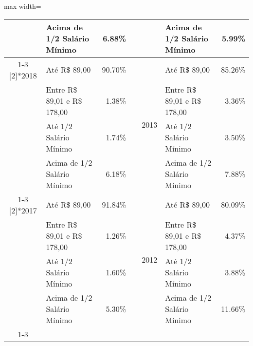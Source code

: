\documentclass[14pt]{extarticle}
\begin{document}
\begin{table}[htbp]
\begin{adjustbox}{max width=\linewidth}
\begin{tabular}{clrrclr}
         & Acima de 1/2 Salário Mínimo & 6.88\% &      &      & Acima de 1/2 Salário Mínimo & 5.99\% \\
\cmidrule{1-3}\cmidrule{5-7}    \multirow{4}[2]{*}{2018} & Até R\$ 89,00 & 90.70\% &      & \multirow{4}[2]{*}{2013} & Até R\$ 89,00 & 85.26\% \\
         & Entre R\$ 89,01 e R\$ 178,00 & 1.38\% &      &      & Entre R\$ 89,01 e R\$ 178,00 & 3.36\% \\
         & Até 1/2 Salário Mínimo & 1.74\% &      &      & Até 1/2 Salário Mínimo & 3.50\% \\
         & Acima de 1/2 Salário Mínimo & 6.18\% &      &      & Acima de 1/2 Salário Mínimo & 7.88\% \\
\cmidrule{1-3}\cmidrule{5-7}    \multirow{4}[2]{*}{2017} & Até R\$ 89,00 & 91.84\% &      & \multirow{4}[2]{*}{2012} & Até R\$ 89,00 & 80.09\% \\
         & Entre R\$ 89,01 e R\$ 178,00 & 1.26\% &      &      & Entre R\$ 89,01 e R\$ 178,00 & 4.37\% \\
         & Até 1/2 Salário Mínimo & 1.60\% &      &      & Até 1/2 Salário Mínimo & 3.88\% \\
         & Acima de 1/2 Salário Mínimo & 5.30\% &      &      & Acima de 1/2 Salário Mínimo & 11.66\% \\
\cmidrule{1-3}\cmidrule{5-7}    
\end{tabular}%
\end{adjustbox}
  \label{tab:tabela_renda1}%
\end{table}%
\end{document}
